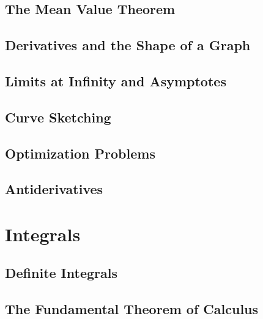 \documentclass[]{book}
\theoremstyle{definition}
\theoremstyle{definition}
\theoremstyle{definition}
\theoremstyle{remark}
\begin{document}
\hypertarget{the-mean-value-theorem}{%
\section{The Mean Value Theorem}\label{the-mean-value-theorem}}

\hypertarget{derivatives-and-the-shape-of-a-graph}{%
\section{Derivatives and the Shape of a Graph}\label{derivatives-and-the-shape-of-a-graph}}

\hypertarget{limits-at-infinity-and-asymptotes}{%
\section{Limits at Infinity and Asymptotes}\label{limits-at-infinity-and-asymptotes}}

\hypertarget{curve-sketching}{%
\section{Curve Sketching}\label{curve-sketching}}

\hypertarget{optimization-problems}{%
\section{Optimization Problems}\label{optimization-problems}}

\hypertarget{antiderivatives}{%
\section{Antiderivatives}\label{antiderivatives}}

\hypertarget{integrals}{%
\chapter{Integrals}\label{integrals}}

\hypertarget{definite-integrals}{%
\section{Definite Integrals}\label{definite-integrals}}

\hypertarget{the-fundamental-theorem-of-calculus}{%
\section{The Fundamental Theorem of Calculus}\label{the-fundamental-theorem-of-calculus}}
\end{document}
